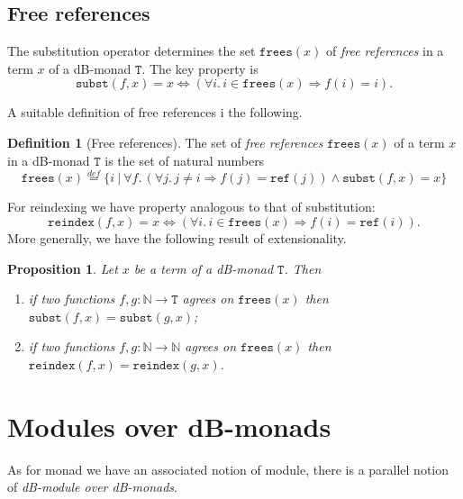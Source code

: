 \documentclass[a4paper,twoside,12pt]{article}
\newtheorem{proposition}{Proposition}
\theoremstyle{definition}
\newtheorem{definition}{Definition}
\theoremstyle{remark}
\theoremstyle{example}
\newcommand{\NN}{\mathbb{N}}
\newcommand{\TT}{\mathtt{T}}
\newcommand{\subst}{\mathtt{subst}}
\newcommand{\refe}{\mathtt{ref}}
\newcommand{\frees}{\mathtt{frees}}
\newcommand{\reindex}{\mathtt{reindex}}
\begin{document}
\subsection{Free references}
\label{sec:free-references}

The substitution operator determines the set $\frees(x)$ of \emph{free
  references} in a term $x$ of a dB-monad $\TT$.  The key property is
\begin{equation*}
  \subst(f,x) = x \Longleftrightarrow
  (\forall i.\, i \in \mathtt{frees}(x) \Longrightarrow f(i) = i).
\end{equation*}

A suitable definition of free references i the following.
\begin{definition}[Free references]
  The set of \emph{free references} $\frees(x)$ of a term $x$ in a
  dB-monad $\TT$ is the set of natural numbers
  \begin{equation*}
    \frees(x) \stackrel{def}{=}
    \Big\{
    i\ \Big|\  \forall f.\, (\forall j.\, j\neq i \Longrightarrow f(j) = \refe(j)) \wedge
    \subst(f,x) = x
    \Big\}
  \end{equation*}
\end{definition}

For reindexing we have property analogous to that of substitution:
\begin{equation*}
  \reindex(f,x) = x \Longleftrightarrow
  (\forall i.\, i \in \mathtt{frees}(x) \Longrightarrow f(i) = \refe(i)).
\end{equation*}
More generally, we have the following result of extensionality.
\begin{proposition}
  Let $x$ be a term of a dB-monad $\TT$.  Then
  \begin{enumerate}
  \item if two functions $f,g\colon \NN\to \TT$ agrees on $\frees(x)$
    then $\subst(f,x) = \subst(g,x)$;
  \item if two functions $f,g\colon \NN\to \NN$ agrees on $\frees(x)$
    then $\reindex(f,x) = \reindex(g,x)$.
  \end{enumerate}
\end{proposition}

\section{Modules over dB-monads}
\label{sec:modules}

As for monad we have an associated notion of module, there is a
parallel notion of \emph{dB-module over dB-monads}.
\end{document}
